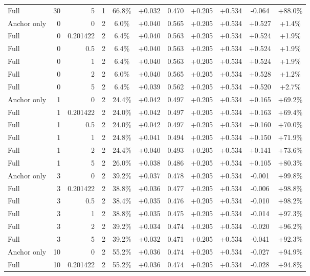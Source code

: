 \begin{table}[htbp]
\begin{tabular}{lrrrccccccc}
Full & 30 & 5 & 1 & 66.8\% & +0.032 & 0.470 & +0.205 & +0.534 & -0.064 & +88.0\% \\
Anchor only & 0 & 0 & 2 & 6.0\% & +0.040 & 0.565 & +0.205 & +0.534 & +0.527 & +1.4\% \\
Full & 0 & 0.201422 & 2 & 6.4\% & +0.040 & 0.563 & +0.205 & +0.534 & +0.524 & +1.9\% \\
Full & 0 & 0.5 & 2 & 6.4\% & +0.040 & 0.563 & +0.205 & +0.534 & +0.524 & +1.9\% \\
Full & 0 & 1 & 2 & 6.4\% & +0.040 & 0.563 & +0.205 & +0.534 & +0.524 & +1.9\% \\
Full & 0 & 2 & 2 & 6.0\% & +0.040 & 0.565 & +0.205 & +0.534 & +0.528 & +1.2\% \\
Full & 0 & 5 & 2 & 6.4\% & +0.039 & 0.562 & +0.205 & +0.534 & +0.520 & +2.7\% \\
Anchor only & 1 & 0 & 2 & 24.4\% & +0.042 & 0.497 & +0.205 & +0.534 & +0.165 & +69.2\% \\
Full & 1 & 0.201422 & 2 & 24.0\% & +0.042 & 0.497 & +0.205 & +0.534 & +0.163 & +69.4\% \\
Full & 1 & 0.5 & 2 & 24.0\% & +0.042 & 0.497 & +0.205 & +0.534 & +0.160 & +70.0\% \\
Full & 1 & 1 & 2 & 24.8\% & +0.041 & 0.494 & +0.205 & +0.534 & +0.150 & +71.9\% \\
Full & 1 & 2 & 2 & 24.4\% & +0.040 & 0.493 & +0.205 & +0.534 & +0.141 & +73.6\% \\
Full & 1 & 5 & 2 & 26.0\% & +0.038 & 0.486 & +0.205 & +0.534 & +0.105 & +80.3\% \\
Anchor only & 3 & 0 & 2 & 39.2\% & +0.037 & 0.478 & +0.205 & +0.534 & -0.001 & +99.8\% \\
Full & 3 & 0.201422 & 2 & 38.8\% & +0.036 & 0.477 & +0.205 & +0.534 & -0.006 & +98.8\% \\
Full & 3 & 0.5 & 2 & 38.4\% & +0.035 & 0.476 & +0.205 & +0.534 & -0.010 & +98.2\% \\
Full & 3 & 1 & 2 & 38.8\% & +0.035 & 0.475 & +0.205 & +0.534 & -0.014 & +97.3\% \\
Full & 3 & 2 & 2 & 39.2\% & +0.034 & 0.474 & +0.205 & +0.534 & -0.020 & +96.2\% \\
Full & 3 & 5 & 2 & 39.2\% & +0.032 & 0.471 & +0.205 & +0.534 & -0.041 & +92.3\% \\
Anchor only & 10 & 0 & 2 & 55.2\% & +0.036 & 0.474 & +0.205 & +0.534 & -0.027 & +94.9\% \\
Full & 10 & 0.201422 & 2 & 55.2\% & +0.036 & 0.474 & +0.205 & +0.534 & -0.028 & +94.8\% \\

\end{tabular}
\end{table}
